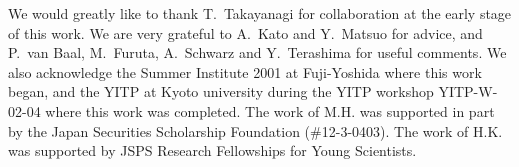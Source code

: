 \documentclass[a4paper,epsf,12pt]{article}
\begin{document}
\vspace{2mm}
\begin{center}
\end{center}

We would greatly like to thank T.~Takayanagi
for collaboration at the early stage of this work.
We are very grateful to A.~Kato and Y.~Matsuo 
for advice,
and P.~van Baal, M.~Furuta, A.~Schwarz and Y.~Terashima
for useful comments. 
We also acknowledge the Summer Institute
2001 at Fuji-Yoshida where this work began,
and the YITP at Kyoto university during the YITP workshop YITP-W-02-04
where this work was completed.
The work of M.H. was supported in part by
the Japan Securities Scholarship Foundation (\#12-3-0403).
The work of H.K. was supported 
by JSPS Research Fellowships for Young
Scientists.

\appendix
\end{document}
